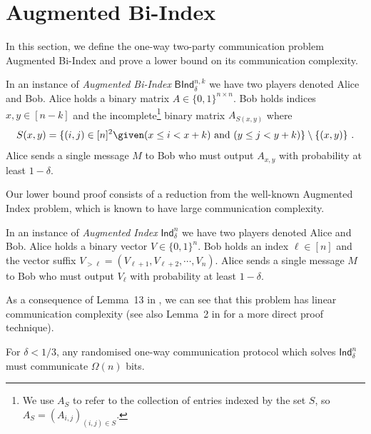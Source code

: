 \setcounter{section}{1}
\setcounter{figure}{1}
\section{Augmented Bi-Index} \label{sec:aug-bi-index}
In this section, we define the one-way two-party communication problem \textsf{Augmented Bi-Index} and prove a
lower bound on its communication complexity. 

\begin{problem}
    In an instance of {\em \textsf{Augmented Bi-Index}} {\em $\textsf{BInd}^{n,k}_\delta$} we have two players denoted Alice and Bob.
    Alice holds a binary matrix $A \in \lbrace 0,1 \rbrace^{n \times n}$. Bob holds indices $x, y \in [n-k]$ and the incomplete\footnote{We use $A_S$ to refer to the collection of entries indexed by the set $S$, so $A_S = (A_{i,j})_{(i,j)\in S}$.} binary matrix $A_{S(x,y)}$ where
    \[
        S(x,y) = \{ (i,j) \in [n]^2 \given (x \leq i < x + k) \text{ and } (y \leq j < y + k) \} \setminus \{ (x,y) \} \ .
    \]    
    Alice sends a single message $M$ to Bob who must output $A_{x, y}$ with probability at least $1-\delta$.
\end{problem}

Our lower bound proof consists of a reduction from the well-known \textsf{Augmented Index} problem, which is known to 
have large communication complexity.



%

\begin{problem}
    In an instance of {\em \textsf{Augmented Index}} {\em $\textsf{Ind}^{n}_\delta$} we have two players denoted Alice and Bob.
    Alice holds a binary vector $V \in \lbrace 0,1 \rbrace^n$. Bob holds an index $\ell \in [n]$ and the vector suffix $V_{>\ell} = (V_{\ell+1}, V_{\ell+2}, \cdots, V_n)$. 
    Alice sends a single message $M$ to Bob who must output $V_\ell$ with probability at least $1-\delta$.
\end{problem}

As a consequence of Lemma~13 in \cite{mnsw98}, we can see that this problem has linear communication complexity (see also Lemma~2 in \cite{bjkk04} for a more direct proof technique).

\begin{theorem}\label{thm:augind-lower}
    For $\delta < 1/3$, any randomised one-way communication protocol which solves $\textsf{Ind}^{n}_\delta$ must communicate $\Omega(n)$ bits.
\end{theorem}

